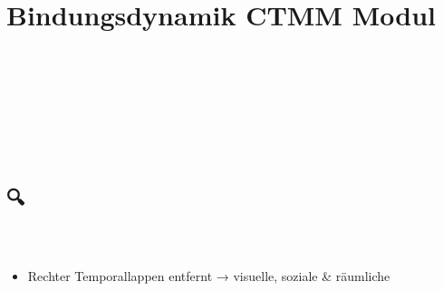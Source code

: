 
\section{Bindungsdynamik CTMM Modul}
\label{sec:bindungsdynamik-ctmm-modul}

\hypertarget{bindungsdynamik}{%
\section[ 🧾 \ul{\textbf{\textcolor{ctmmBlue}{\1}}}]{\texorpdfstring{\protect\hypertarget{Xe2e0dbbaafa7bad5f1f880a482e87a862ef7664}{}{} 🧾 \ul{\textbf{\textcolor{ctmmBlue}{\1}}}}{ 🧾 BINDUNGSDYNAMIK --}}\label{bindungsdynamik}}

\hypertarget{ctmm-modul}{%
\section{\texorpdfstring{\ul{\textbf{\textcolor{ctmmBlue}{\1}}}}{CTMM-MODUL}}\label{ctmm-modul}}

\hfill\break
\hfill\break

🧩 \textbf{\textcolor{ctmmBlue}{\1}} \textbf{\textcolor{ctmmBlue}{\1}} \textbf{\textcolor{ctmmBlue}{\1}} \textbf{\textcolor{ctmmBlue}{\1}}

\hfill\break
\hfill\break

\hypertarget{ausgangslage-neuropsychologische-profilbesonderheiten}{%
\subsection[ 🔍 \ul{\textbf{\textcolor{ctmmBlue}{\1}}}]{\texorpdfstring{\protect\hypertarget{X9ed96c8f1cb3a6be4a8256a56dbf4cde548357e}{}{} 🔍 \ul{\textbf{\textcolor{ctmmBlue}{\1}}}}{ 🔍 AUSGANGSLAGE: NEUROPSYCHOLOGISCHE PROFILBESONDERHEITEN}}\label{ausgangslage-neuropsychologische-profilbesonderheiten}}

\hypertarget{er-kptbs-ass-adhs-post-op}{%
\subsubsection[🔵 \textbf{\textcolor{ctmmBlue}{\1}}]{\texorpdfstring{\protect\hypertarget{er-kptbs-ass-adhs-post-op}{}{}🔵 \textbf{\textcolor{ctmmBlue}{\1}}}{🔵 ER (kPTBS, ASS, ADHS, Post-OP)}}\label{er-kptbs-ass-adhs-post-op}}

\begin{itemize}[label=\textcolor{ctmmOrange}{\faArrowRight}]
\tightlist
\item
  Rechter Temporallappen entfernt → visuelle, soziale \& räumliche
\end{itemize}


